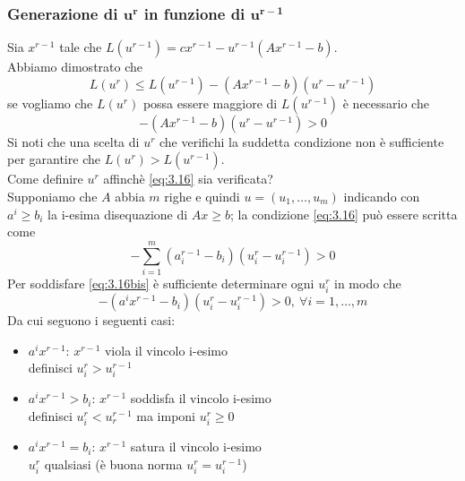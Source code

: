 \subsubsection{Generazione di $\boldsymbol{u^{r}}$ in funzione di $\boldsymbol{u^{r-1}}$}
Sia $x^{r-1}$ tale che $L(u^{r-1})=cx^{r-1}-u^{r-1}(Ax^{r-1}-b)$.\\
Abbiamo dimostrato che
\begin{equation*}
	L(u^{r})\le L(u^{r-1})-(Ax^{r-1}-b)(u^{r}-u^{r-1})
\end{equation*}
se vogliamo che $L(u^{r})$ possa essere maggiore di $L(u^{r-1})$ è necessario che
\begin{equation}
	-(Ax^{r-1}-b)(u^{r}-u^{r-1})>0 \label{eq:3.16}
\end{equation}
Si noti che una scelta di $u^{r}$ che verifichi la suddetta condizione non è sufficiente per garantire che $L(u^{r})>L(u^{r-1})$.\\
Come definire $u^{r}$ affinchè \ref{eq:3.16} sia verificata?\\
Supponiamo che $A$ abbia $m$ righe e quindi $u=(u_{1},\dots,u_{m})$ indicando con $a^{i}\ge b_{i}$ la i-esima disequazione di $Ax\ge b$; la condizione \ref{eq:3.16} può essere scritta come
\begin{equation}
	-\sum_{i=1}^{m}(a_{i}^{r-1}-b_{i})(u_{i}^{r}-u_{i}^{r-1})>0 \label{eq:3.16bis}
\end{equation}
Per soddisfare \ref{eq:3.16bis} è sufficiente determinare ogni $u_{i}^{r}$ in modo che
\begin{equation*}
	-(a^{i}x^{r-1}-b_{i})(u_{i}^{r}-u_{i}^{r-1})>0,\ \forall i=1,\dots,m
\end{equation*}
Da cui seguono i seguenti casi:

\begin{itemize}
	\item $a^{i}x^{r-1}$: $x^{r-1}$ viola il vincolo i-esimo \\
	definisci $u_{i}^{r}>u_{i}^{r-1}$
	\item $a^{i}x^{r-1}>b_{i}$: $x^{r-1}$ soddisfa il vincolo i-esimo \\
	definisci $u_{i}^{r}<u_{r}^{r-1}$ ma imponi $u_{i}^{r}\ge 0$
	\item $a^{i}x^{r-1}=b_{i}$: $x^{r-1}$ satura il vincolo i-esimo \\
	$u_{i}^{r}$ qualsiasi (è buona norma $u_{i}^{r}=u_{i}^{r-1}$)
\end{itemize}


